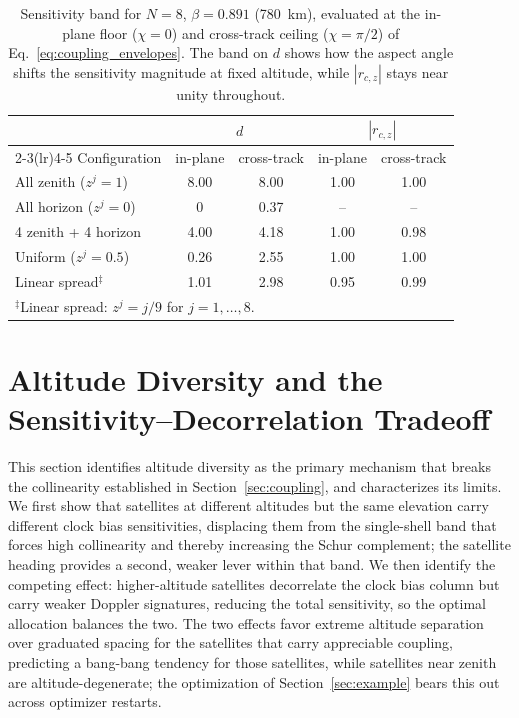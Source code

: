 \documentclass[letterpaper,times]{IONconf-v2}
\theoremstyle{plain}
\theoremstyle{remark}
\begin{document}
\vspace{-10pt}

\begin{table}[htbp!]
\caption{Sensitivity band for $N = 8$, $\beta = 0.891$ (780~km), evaluated at the in-plane floor ($\chi = 0$) and cross-track ceiling ($\chi = \pi/2$) of Eq.~\eqref{eq:coupling_envelopes}. The band on $d$ shows how the aspect angle shifts the sensitivity magnitude at fixed altitude, while $|r_{c,z}|$ stays near unity throughout.}
\label{tab:elevation_bounds}
\centering
\footnotesize
\begin{tabular}{lcccc}
 & \multicolumn{2}{c}{$d$} & \multicolumn{2}{c}{$|r_{c,z}|$} \\
\cmidrule(lr){2-3}\cmidrule(lr){4-5}
Configuration & in-plane & cross-track & in-plane & cross-track \\
\midrule
All zenith ($z^j = 1$)            & 8.00 & 8.00 & 1.00 & 1.00 \\
All horizon ($z^j = 0$)           & 0    & 0.37 & --   & --   \\
4 zenith + 4 horizon              & 4.00 & 4.18 & 1.00 & 0.98 \\
Uniform ($z^j = 0.5$)             & 0.26 & 2.55 & 1.00 & 1.00 \\
Linear spread$^\ddagger$          & 1.01 & 2.98 & 0.95 & 0.99 \\
\bottomrule
\multicolumn{5}{l}{\footnotesize $^\ddagger$Linear spread: $z^j = j/9$ for $j = 1,\ldots,8$.}\\
\end{tabular}
\end{table}

\vspace{-5pt}

\section{Altitude Diversity and the Sensitivity--Decorrelation Tradeoff}\label{sec:altitude}
This section identifies altitude diversity as the primary mechanism that breaks the collinearity established in Section~\ref{sec:coupling}, and characterizes its limits. We first show that satellites at different altitudes but the same elevation carry different clock bias sensitivities, displacing them from the single-shell band that forces high collinearity and thereby increasing the Schur complement; the satellite heading provides a second, weaker lever within that band. We then identify the competing effect: higher-altitude satellites decorrelate the clock bias column but carry weaker Doppler signatures, reducing the total sensitivity, so the optimal allocation balances the two. The two effects favor extreme altitude separation over graduated spacing for the satellites that carry appreciable coupling, predicting a bang-bang tendency for those satellites, while satellites near zenith are altitude-degenerate; the optimization of Section~\ref{sec:example} bears this out across optimizer restarts.
\end{document}
